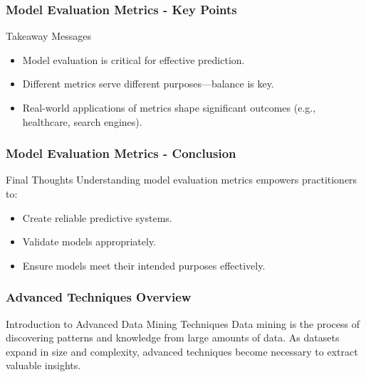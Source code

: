 \documentclass[aspectratio=169]{beamer}
\begin{document}
\begin{frame}[fragile]
    \frametitle{Model Evaluation Metrics - Key Points}
    \begin{block}{Takeaway Messages}
        \begin{itemize}
            \item Model evaluation is critical for effective prediction.
            \item Different metrics serve different purposes—balance is key.
            \item Real-world applications of metrics shape significant outcomes (e.g., healthcare, search engines).
        \end{itemize}
    \end{block}
\end{frame}

\begin{frame}[fragile]
    \frametitle{Model Evaluation Metrics - Conclusion}
    \begin{block}{Final Thoughts}
        Understanding model evaluation metrics empowers practitioners to:
        \begin{itemize}
            \item Create reliable predictive systems.
            \item Validate models appropriately.
            \item Ensure models meet their intended purposes effectively.
        \end{itemize}
    \end{block}
\end{frame}

\begin{frame}[fragile]
    \frametitle{Advanced Techniques Overview}
    \begin{block}{Introduction to Advanced Data Mining Techniques}
        Data mining is the process of discovering patterns and knowledge from large amounts of data. As datasets expand in size and complexity, advanced techniques become necessary to extract valuable insights.
    \end{block}
\end{frame}
\end{document}
